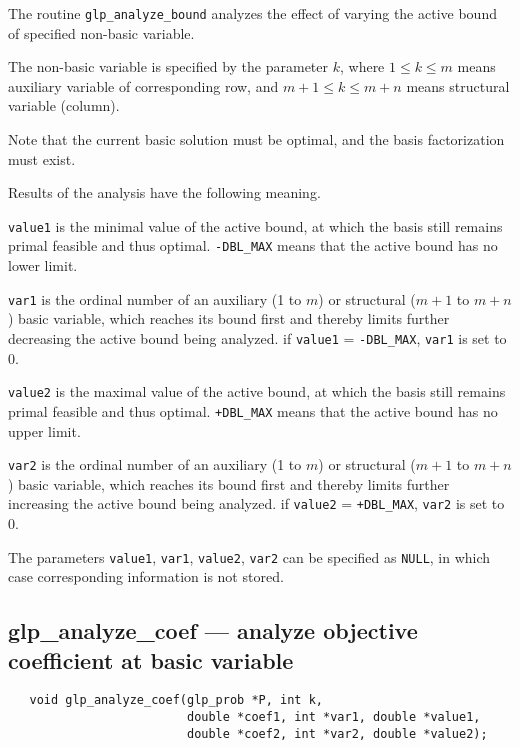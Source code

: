 \description

The routine \verb|glp_analyze_bound| analyzes the effect of varying the
active bound of specified non-basic variable.

The non-basic variable is specified by the parameter $k$, where
$1\leq k\leq m$ means auxiliary variable of corresponding row, and
$m+1\leq k\leq m+n$ means structural variable (column).

Note that the current basic solution must be optimal, and the basis
factorization must exist.

Results of the analysis have the following meaning.

\verb|value1| is the minimal value of the active bound, at which the
basis still remains primal feasible and thus optimal. \verb|-DBL_MAX|
means that the active bound has no lower limit.

\verb|var1| is the ordinal number of an auxiliary (1 to $m$) or
structural ($m+1$ to $m+n$) basic variable, which reaches its bound
first and thereby limits further decreasing the active bound being
analyzed. if \verb|value1| = \verb|-DBL_MAX|, \verb|var1| is set to 0.

\verb|value2| is the maximal value of the active bound, at which the
basis still remains primal feasible and thus optimal. \verb|+DBL_MAX|
means that the active bound has no upper limit.

\verb|var2| is the ordinal number of an auxiliary (1 to $m$) or
structural ($m+1$ to $m+n$) basic variable, which reaches its bound
first and thereby limits further increasing the active bound being
analyzed. if \verb|value2| = \verb|+DBL_MAX|, \verb|var2| is set to 0.

The parameters \verb|value1|, \verb|var1|, \verb|value2|, \verb|var2|
can be specified as \verb|NULL|, in which case corresponding information
is not stored.

\subsection{glp\_analyze\_coef --- analyze objective coefficient at
basic variable}

\synopsis

\begin{verbatim}
   void glp_analyze_coef(glp_prob *P, int k,
                         double *coef1, int *var1, double *value1,
                         double *coef2, int *var2, double *value2);
\end{verbatim}

